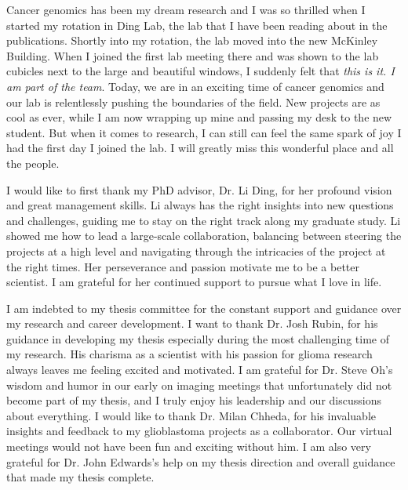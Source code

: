 \thesisacknowledgments

Cancer genomics has been my dream research and I was so thrilled when I started my rotation in Ding Lab, the lab that I have been reading about in the publications.
Shortly into my rotation, the lab moved into the new McKinley Building.
When I joined the first lab meeting there and was shown to the lab cubicles next to the large and beautiful windows, I suddenly felt that \textit{this is it. I am part of the team}.
Today, we are in an exciting time of cancer genomics and our lab is relentlessly pushing the boundaries of the field.
New projects are as cool as ever, while I am now wrapping up mine and passing my desk to the new student.
But when it comes to research, I can still can feel the same spark of joy I had the first day I joined the lab.
I will greatly miss this wonderful place and all the people.

I would like to first thank my PhD advisor, Dr. Li Ding, for her profound vision and great management skills.
Li always has the right insights into new questions and challenges, guiding me to stay on the right track along my graduate study.
Li showed me how to lead a large-scale collaboration, balancing between steering the projects at a high level and navigating through the intricacies of the project at the right times.
Her perseverance and passion motivate me to be a better scientist.
I am grateful for her continued support to pursue what I love in life.

I am indebted to my thesis committee for the constant support and guidance over my research and career development.
I want to thank Dr. Josh Rubin, for his guidance in developing my thesis especially during the most challenging time of my research.
His charisma as a scientist with his passion for glioma research always leaves me feeling excited and motivated.
I am grateful for Dr. Steve Oh's wisdom and humor in our early on imaging meetings that unfortunately did not become part of my thesis, and I truly enjoy his leadership and our discussions about everything.
I would like to thank Dr. Milan Chheda, for his invaluable insights and feedback to my glioblastoma projects as a collaborator.
Our virtual meetings would not have been fun and exciting without him.
I am also very grateful for Dr. John Edwards's help on my thesis direction and overall guidance that made my thesis complete.

